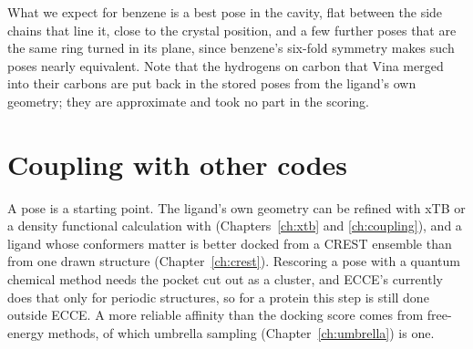 What we expect for benzene is a best pose in the cavity, flat between the side chains that line it, close to the crystal position, and a few further poses that are the same ring turned in its plane, since benzene's six-fold symmetry makes such poses nearly equivalent. Note that the hydrogens on carbon that Vina merged into their carbons are put back in the stored poses from the ligand's own geometry; they are approximate and took no part in the scoring.

\section{Coupling with other codes}
A pose is a starting point. The ligand's own geometry can be refined with xTB or a density functional calculation with  (Chapters~\ref{ch:xtb} and \ref{ch:coupling}), and a ligand whose conformers matter is better docked from a CREST ensemble than from one drawn structure (Chapter~\ref{ch:crest}). Rescoring a pose with a quantum chemical method needs the pocket cut out as a cluster, and ECCE's  currently does that only for periodic structures, so for a protein this step is still done outside ECCE. A more reliable affinity than the docking score comes from free-energy methods, of which umbrella sampling (Chapter~\ref{ch:umbrella}) is one.
